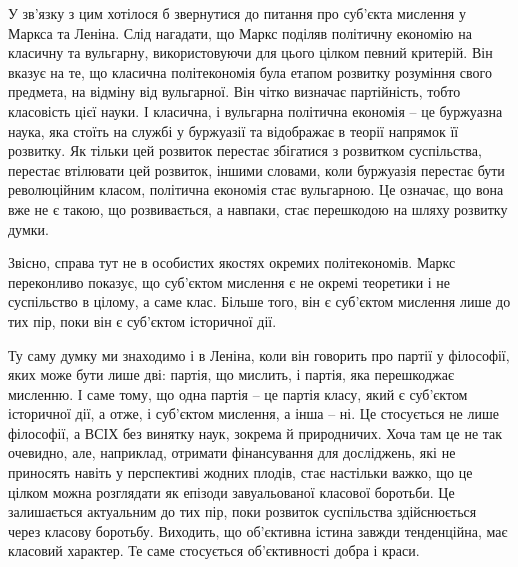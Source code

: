 \documentclass[../main]{subfiles}
\begin{document}
У зв’язку з цим хотілося б звернутися до питання про суб’єкта мислення у Маркса та Леніна. Слід нагадати, що Маркс поділяв політичну економію на класичну та вульгарну, використовуючи для цього цілком певний критерій. Він вказує на те, що класична політекономія була етапом розвитку розуміння свого предмета, на відміну від вульгарної. Він чітко визначає партійність, тобто класовість цієї науки. І класична, і вульгарна політична економія – це буржуазна наука, яка стоїть на службі у буржуазії та відображає в теорії напрямок її розвитку. Як тільки цей розвиток перестає збігатися з розвитком суспільства, перестає втілювати цей розвиток, іншими словами, коли буржуазія перестає бути революційним класом, політична економія стає вульгарною. Це означає, що вона вже не є такою, що розвивається, а навпаки, стає перешкодою на шляху розвитку думки.

Звісно, справа тут не в особистих якостях окремих політекономів. Маркс переконливо показує, що суб’єктом мислення є не окремі теоретики і не суспільство в цілому, а саме клас. Більше того, він є суб’єктом мислення лише до тих пір, поки він є суб’єктом історичної дії.

Ту саму думку ми знаходимо і в Леніна, коли він говорить про партії у філософії, яких може бути лише дві: партія, що мислить, і партія, яка перешкоджає мисленню. І саме тому, що одна партія – це партія класу, який є суб’єктом історичної дії, а отже, і суб’єктом мислення, а інша – ні. Це стосується не лише філософії, а ВСІХ без винятку наук, зокрема й природничих. Хоча там це не так очевидно, але, наприклад, отримати фінансування для досліджень, які не приносять навіть у перспективі жодних плодів, стає настільки важко, що це цілком можна розглядати як епізоди завуальованої класової боротьби. Це залишається актуальним до тих пір, поки розвиток суспільства здійснюється через класову боротьбу. Виходить, що об’єктивна істина завжди тенденційна, має класовий характер. Те саме стосується об’єктивності добра і краси.
\end{document}
